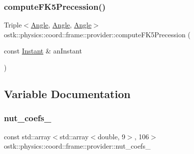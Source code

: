 \subsubsection{\texorpdfstring{compute\+F\+K5\+Precession()}{computeFK5Precession()}}
{\footnotesize\ttfamily Triple$<$\hyperlink{classostk_1_1physics_1_1units_1_1_angle}{Angle}, \hyperlink{classostk_1_1physics_1_1units_1_1_angle}{Angle}, \hyperlink{classostk_1_1physics_1_1units_1_1_angle}{Angle}$>$ ostk\+::physics\+::coord\+::frame\+::provider\+::compute\+F\+K5\+Precession (\begin{DoxyParamCaption}\item[{const \hyperlink{classostk_1_1physics_1_1time_1_1_instant}{Instant} \&}]{an\+Instant }\end{DoxyParamCaption})}



\subsection{Variable Documentation}
\mbox{\label{namespaceostk_1_1physics_1_1coord_1_1frame_1_1provider_a73bcae3137799317545b837aa5693632}} 
\subsubsection{\texorpdfstring{nut\+\_\+coefs\+\_}{nut\_coefs\_1980}}
{\footnotesize\ttfamily const std\+::array$<$std\+::array$<$double, 9$>$, 106$>$ ostk\+::physics\+::coord\+::frame\+::provider\+::nut\+\_\+coefs\+\_}

